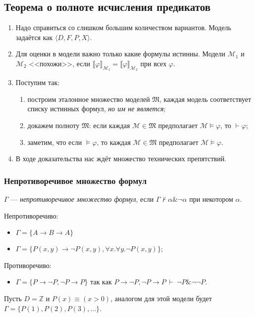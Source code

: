 \subsection{Теорема о полноте исчисления предикатов}
\begin{enumerate}
    \item Надо справиться со слишком большим количеством вариантов.
          Модель задаётся как $\langle D,F,P,X \rangle$.
    \item Для оценки в модели важно только какие формулы истинны.
          Модели $\mathcal{M}_1$ и $\mathcal{M}_2$ <<похожи>>, если
          $\llbracket \varphi \rrbracket_{\mathcal{M}_1} = \llbracket \varphi \rrbracket_{\mathcal{M}_2}$
          при всех $\varphi$.
    \item Поступим так:
        \begin{enumerate}
           \item построим эталонное множество моделей $\mathfrak{M}$, каждая модель соответствует списку истинных формул, \emph{но им не является};
           \item докажем полноту $\mathfrak{M}$: если каждая $\mathcal{M} \in \mathfrak{M}$ предполагает $\mathcal{M}\models\varphi$,
                 то $\vdash\varphi$;
           \item заметим, что если $\models\varphi$, то каждая $\mathcal{M} \in \mathfrak{M}$ предполагает $\mathcal{M}\models\varphi$.
        \end{enumerate}
    \item В ходе доказательства нас ждёт множество технических препятствий.
\end{enumerate}

\subsubsection{Непротиворечивое множество формул}
\begin{definition}
    $\Gamma$ --- \emph{непротиворечивое множество формул}, если $\Gamma\not\vdash\alpha\&\neg\alpha$ при некотором $\alpha$.
\end{definition}

\begin{example}
    Непротиворечиво: \begin{itemize}
        \item $\Gamma = \{A \rightarrow B \rightarrow A\}$
        \item $\Gamma = \{P(x,y)\rightarrow\neg P(x,y), \forall x.\forall y.\neg P(x,y)\}$;
    \end{itemize}

    Противоречиво: \begin{itemize}
        \item $\Gamma = \{P\rightarrow\neg P, \neg P \rightarrow P\}$
        так как
        $P\rightarrow\neg P, \neg P \rightarrow P \ \vdash\  \neg P \& \neg\neg P$.
\end{itemize}

    Пусть $D = \mathbb{Z}$ и $P(x) \equiv (x > 0)$, аналогом для этой модели
    будет $\Gamma = \{P(1), P(2), P(3), \dots\}$.
\end{example}

